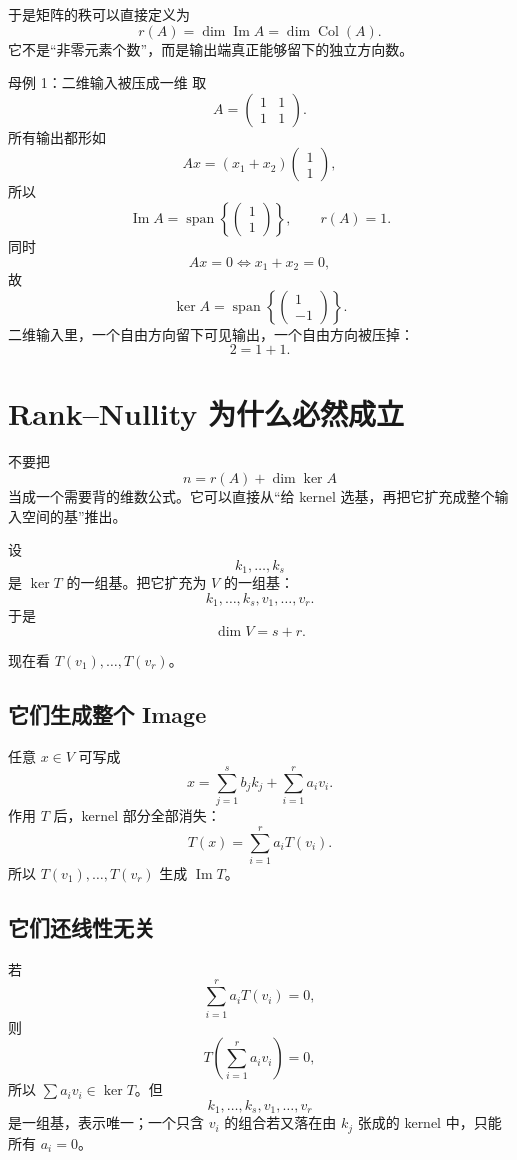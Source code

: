 \documentclass[11pt,a4paper]{ctexart}
\begin{document}
于是矩阵的秩可以直接定义为
\[
\boxed{r(A)=\dim\operatorname{Im}A=\dim\operatorname{Col}(A).}
\]
它不是“非零元素个数”，而是输出端真正能够留下的独立方向数。

\begin{examplebox}{母例 1：二维输入被压成一维}
取
\[
A=\begin{pmatrix}1&1\\1&1\end{pmatrix}.
\]
所有输出都形如
\[
Ax=(x_1+x_2)\begin{pmatrix}1\\1\end{pmatrix},
\]
所以
\[
\operatorname{Im}A
=\operatorname{span}\left\{\begin{pmatrix}1\\1\end{pmatrix}\right\},
\qquad r(A)=1.
\]
同时
\[
Ax=0\iff x_1+x_2=0,
\]
故
\[
\ker A
=\operatorname{span}\left\{\begin{pmatrix}1\\-1\end{pmatrix}\right\}.
\]
二维输入里，一个自由方向留下可见输出，一个自由方向被压掉：
\[
\boxed{2=1+1.}
\]
\end{examplebox}

\section{Rank--Nullity 为什么必然成立}

不要把
\[
n=r(A)+\dim\ker A
\]
当成一个需要背的维数公式。它可以直接从“给 kernel 选基，再把它扩充成整个输入空间的基”推出。

设
\[
k_1,\dots,k_s
\]
是 $\ker T$ 的一组基。把它扩充为 $V$ 的一组基：
\[
k_1,\dots,k_s,v_1,\dots,v_r.
\]
于是
\[
\dim V=s+r.
\]

现在看 $T(v_1),\dots,T(v_r)$。

\subsection{它们生成整个 Image}
任意 $x\in V$ 可写成
\[
x=\sum_{j=1}^{s}b_jk_j+\sum_{i=1}^{r}a_iv_i.
\]
作用 $T$ 后，kernel 部分全部消失：
\[
T(x)=\sum_{i=1}^{r}a_iT(v_i).
\]
所以 $T(v_1),\dots,T(v_r)$ 生成 $\operatorname{Im}T$。

\subsection{它们还线性无关}
若
\[
\sum_{i=1}^{r}a_iT(v_i)=0,
\]
则
\[
T\left(\sum_{i=1}^{r}a_iv_i\right)=0,
\]
所以 $\sum a_iv_i\in\ker T$。但
\[
k_1,\dots,k_s,v_1,\dots,v_r
\]
是一组基，表示唯一；一个只含 $v_i$ 的组合若又落在由 $k_j$ 张成的 kernel 中，只能所有 $a_i=0$。
\end{document}
